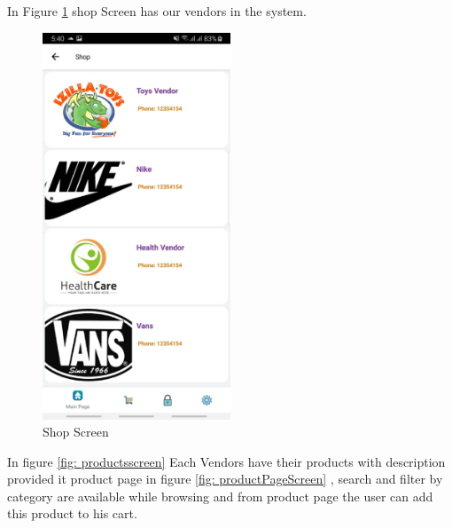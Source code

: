In Figure \ref{fig: shop} shop Screen has our vendors in the system.
  \begin{figure}[htp]%
    \center%
    \includegraphics[width=0.5\textwidth]{images/Software/Shop.jpg}%
    \caption[Mobile Application: Shop Screen]{Shop Screen}\label{fig: shop}%
  \end{figure} \newpage
  
 In figure \ref{fig: productsscreen} Each Vendors have their products with description provided it product page in figure \ref{fig: productPageScreen} , search and filter by category are available while browsing and from product page the user can add this product to his cart.
  
